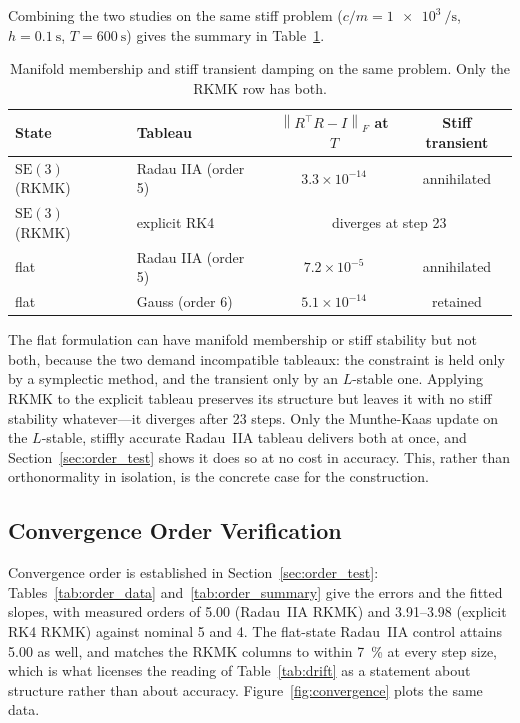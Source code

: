 \documentclass[a4paper,10pt]{article}
\newcommand{\SE}{\mathrm{SE}(3)}
\newcommand{\norm}[1]{\left\lVert #1 \right\rVert}
\theoremstyle{definition}
\begin{document}
Combining the two studies on the same stiff problem
($c/m = \SI{1e3}{\per\second}$, $h = \SI{0.1}{\second}$,
$T = \SI{600}{\second}$) gives the summary in Table~\ref{tab:stiff_exclusive}.

\begin{table}[h]
  \centering
  \caption{Manifold membership and stiff transient damping on the same problem.
    Only the RKMK row has both.}
  \label{tab:stiff_exclusive}
  \small
  \begin{tabular}{llcc}
    \toprule
    State & Tableau & $\norm{R^\top R - I}_F$ at $T$ & Stiff transient \\
    \midrule
    $\SE$ (RKMK) & Radau IIA (order 5) & $3.3\times10^{-14}$ & annihilated \\
    $\SE$ (RKMK) & explicit RK4        & \multicolumn{2}{c}{diverges at step 23} \\
    flat         & Radau IIA (order 5) & $7.2\times10^{-5}$  & annihilated \\
    flat         & Gauss (order 6)     & $5.1\times10^{-14}$ & retained \\
    \bottomrule
  \end{tabular}
\end{table}

The flat formulation can have manifold membership or stiff stability but not
both, because the two demand incompatible tableaux: the constraint is held only
by a symplectic method, and the transient only by an $L$-stable one.  Applying
RKMK to the explicit tableau preserves its structure but leaves it with no
stiff stability whatever---it diverges after \num{23} steps.  Only the
Munthe-Kaas update on the $L$-stable, stiffly accurate Radau~IIA tableau
delivers both at once, and Section~\ref{sec:order_test} shows it does so at no
cost in accuracy.  This, rather than orthonormality in isolation, is the
concrete case for the construction.

\subsection{Convergence Order Verification}

Convergence order is established in Section~\ref{sec:order_test}:
Tables~\ref{tab:order_data} and~\ref{tab:order_summary} give the errors and
the fitted slopes, with measured orders of 5.00 (Radau~IIA RKMK) and
3.91--3.98 (explicit RK4 RKMK) against nominal 5 and 4.  The flat-state
Radau~IIA control attains 5.00 as well, and matches the RKMK columns to within
\SI{7}{\percent} at every step size, which is what licenses the reading of
Table~\ref{tab:drift} as a statement about structure rather than about
accuracy.  Figure~\ref{fig:convergence} plots the same data.
\end{document}
